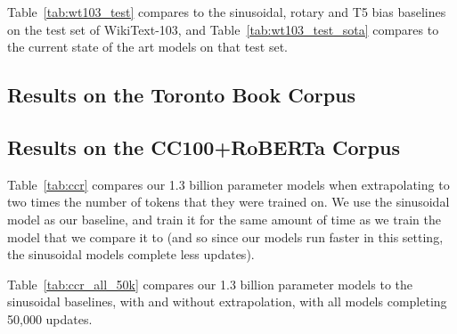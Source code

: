 Table~\ref{tab:wt103_test} compares \al to the sinusoidal, rotary and T5 bias baselines on the test set of WikiText-103, and Table~\ref{tab:wt103_test_sota} compares \al to the current state of the art models on that test set.  



\subsection{Results on the Toronto Book Corpus}
\label{subsec:tbc}











\subsection{Results on the CC100+RoBERTa Corpus}
Table~\ref{tab:ccr} compares our 1.3 billion parameter \al models when extrapolating to two times the number of tokens that they were trained on. We use the sinusoidal model as our baseline, and train it for the same amount of time as we train the \al model that we compare it to (and so since our \al models run faster in this setting, the sinusoidal models complete less updates). 

Table~\ref{tab:ccr_all_50k} compares our 1.3 billion parameter \al models to the sinusoidal baselines, with and without extrapolation, with all models completing 50,000 updates. 











